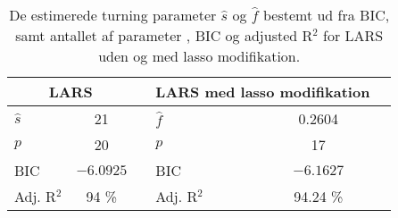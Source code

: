 \begin{table}
\center
\begin{tabular}{lcc | lcc} 
\toprule
\multicolumn{2}{c}{LARS}  && \multicolumn{2}{c}{LARS med lasso modifikation} \\ \midrule
$\widehat{s}$ & 21 && $\widehat{f}$ & 0.2604   \\
$p$ & 20 & & $p$  & 17  \\
BIC & $-6.0925$ && BIC & $-6.1627$  \\
Adj. R$^2$ &94 \% & &  Adj. R$^2$ & 94.24 \% \\ \bottomrule
 \end{tabular}
\caption{De estimerede turning parameter $\widehat{s}$ og $\widehat{f}$ bestemt ud fra BIC, samt antallet af parameter , BIC og adjusted  R$^2$ for LARS uden og med lasso modifikation. } \label{tab:bic_lars}
\end{table}